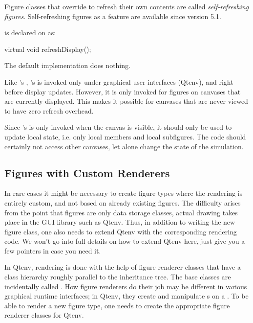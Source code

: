 Figure classes that override  to refresh their
own contents are called \textit{self-refreshing figures}. Self-refreshing
figures as a feature are available since {\opp} version 5.1.

 is declared on  as:

\begin{cpp}
virtual void refreshDisplay();
\end{cpp}

The default implementation does nothing.

Like 's , 's
 is invoked only under graphical user interfaces
(Qtenv), and right before display updates. However, it is only invoked for
figures on canvases that are currently displayed. This makes it possible for
canvases that are never viewed to have zero refresh overhead.

Since 's  is only invoked when the
canvas is visible, it should only be used to update local state, i.e. only
local members and local subfigures. The code should certainly not access
other canvases, let alone change the state of the simulation.


\subsection{Figures with Custom Renderers}
\label{sec:graphics:figures-with-custom-renderers}

In rare cases it might be necessary to create figure types where the rendering
is entirely custom, and not based on already existing figures. The
difficulty arises from the point that figures are only data storage classes,
actual drawing takes place in the GUI library such as Qtenv.
Thus, in addition to writing the new figure class, one also needs to extend
Qtenv with the corresponding rendering code.
We won't go into full details on how to extend Qtenv here, just give
you a few pointers in case you need it.

In Qtenv, rendering is done with the help of figure renderer
classes that have a class hierarchy roughly parallel to the
 inheritance tree. The base classes are incidentally called
. How figure renderers do their job may be different in
various graphical runtime interfaces; in Qtenv, they create and manipulate
s on a . To be able to render a
new figure type, one needs to create the appropriate figure renderer
classes for Qtenv.


